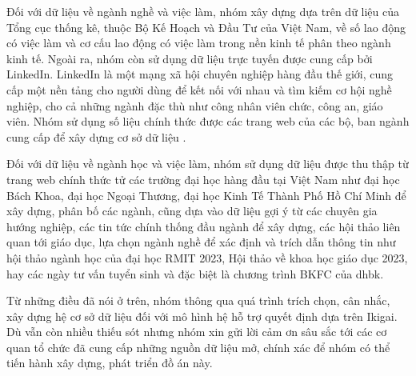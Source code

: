 Đối với dữ liệu về ngành nghề và việc làm, nhóm xây dựng dựa trên dữ liệu của Tổng cục thống kê, thuộc Bộ Kế Hoạch và Đầu Tư của Việt Nam, về số lao động có việc làm và cơ cấu lao động có việc làm trong nền kinh tế phân theo ngành kinh tế. Ngoài ra, nhóm còn sử dụng dữ liệu trực tuyến được cung cấp bởi LinkedIn. LinkedIn là một mạng xã hội chuyên nghiệp hàng đầu thế giới, cung cấp một nền tảng cho người dùng để kết nối với nhau và tìm kiếm cơ hội nghề nghiệp, cho cả những ngành đặc thù như công nhân viên chức, công an, giáo viên. Nhóm sử dụng số liệu chính thức được các trang web của các bộ, ban ngành cung cấp để xây dựng cơ sở dữ liệu \cite{xaydungdang} \cite{vietnamnet} \cite{cafef}.

Đối với dữ liệu về ngành học và việc làm, nhóm sử dụng dữ liệu được thu thập từ trang web chính thức tử các trường đại học hàng đầu tại Việt Nam như đại học Bách Khoa, đại học Ngoại Thương, đại học Kinh Tế Thành Phố Hồ Chí Minh để xây dựng, phân bố các ngành, cũng dựa vào dữ liệu gợi ý từ các chuyên gia hướng nghiệp, các tin tức chính thống đầu ngành để xây dựng, các hội thảo liên quan tới giáo dục, lựa chọn ngành nghề để xác định và trích dẫn thông tin như hội thảo ngành học của đại học RMIT 2023, Hội thảo về khoa học giáo dục 2023, hay các ngày tư vấn tuyển sinh và đặc biệt là chương trình BKFC của \acrlong{dhbk}.

Từ những điều đã nói ở trên, nhóm thông qua quá trình trích chọn, cân nhắc, xây dựng hệ cơ sở dữ liệu đối với mô hình hệ hỗ trợ quyết định dựa trên Ikigai. Dù vẫn còn nhiều thiếu sót nhưng nhóm xin gửi lời cảm ơn sâu sắc tới các cơ quan tổ chức đã cung cấp những nguồn dữ liệu mở, chính xác để nhóm có thể tiến hành xây dựng, phát triển đồ án này.
